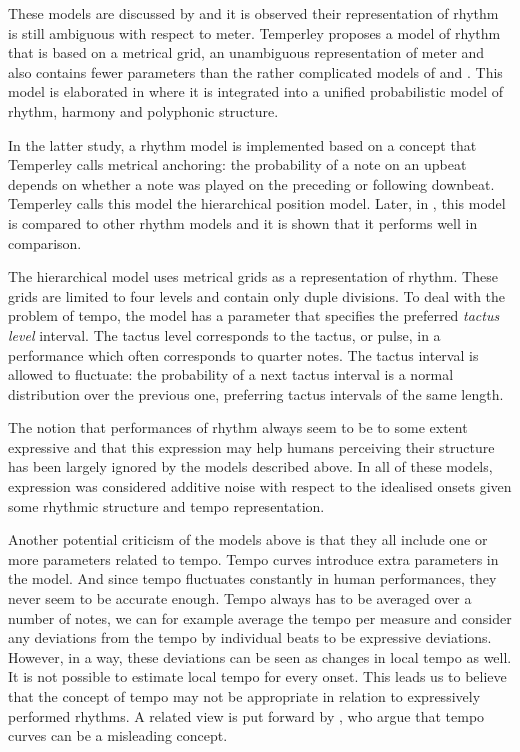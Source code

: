 These models are discussed by \citet{temperley2007music} and it is observed their representation of rhythm is still ambiguous with respect to meter. Temperley proposes a model of rhythm that is based on a metrical grid, an unambiguous representation of meter and also contains fewer parameters than the rather complicated models of \citet{raphael2002hybrid} and \citet{cemgil2000rhythm}. This model is elaborated in \citet{temperley2009unified} where it is integrated into a unified probabilistic model of rhythm, harmony and polyphonic structure.

In the latter study, a rhythm model is implemented based on a concept that Temperley calls metrical anchoring: the probability of a note on an upbeat depends on whether a note was played on the preceding or following downbeat. Temperley calls this model the hierarchical position model. Later, in \citet{temperley2010modeling}, this model is compared to other rhythm models and it is shown that it performs well in comparison. 

The hierarchical model uses metrical grids as a representation of rhythm. These grids are limited to four levels and contain only duple divisions. To deal with the problem of tempo, the model has a parameter that specifies the preferred \textit{tactus level} interval. The tactus level corresponds to the tactus, or pulse, in a performance which often corresponds to quarter notes. The tactus interval is allowed to fluctuate: the probability of a next tactus interval is a normal distribution over the previous one, preferring tactus intervals of the same length.

The notion that performances of rhythm always seem to be to some extent expressive and that this expression may help humans perceiving their structure has been largely ignored by the models described above. In all of these models, expression was considered additive noise with respect to the idealised onsets given some rhythmic structure and tempo representation. 

Another potential criticism of the models above is that they all include one or more parameters related to tempo. Tempo curves introduce extra parameters in the model. And since tempo fluctuates constantly in human performances, they never seem to be accurate enough. Tempo always has to be averaged over a number of notes, we can for example average the tempo per measure and consider any deviations from the tempo by individual beats to be expressive deviations. However, in a way, these deviations can be seen as changes in local tempo as well. It is not possible to estimate local tempo for every onset. This leads us to believe that the concept of tempo may not be appropriate in relation to expressively performed rhythms. A related view is put forward by \citet{desain1993tempo}, who argue that tempo curves can be a misleading concept.


